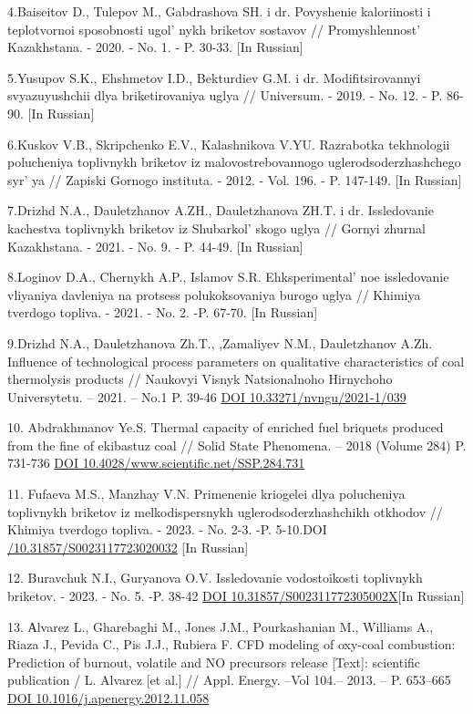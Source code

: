 4.Baiseitov D., Tulepov M., Gabdrashova SH. i dr. Povyshenie
kaloriinosti i teplotvornoi sposobnosti ugol' nykh
briketov sostavov // Promyshlennost'{} Kazakhstana. -
2020. - No. 1. - P. 30-33. {[}In Russian{]}

5.Yusupov S.K., Ehshmetov I.D., Bekturdiev G.M. i dr. Modifitsirovannyi
svyazuyushchii dlya briketirovaniya uglya // Universum. - 2019. - No.
12. - P. 86-90. {[}In Russian{]}

6.Kuskov V.B., Skripchenko E.V., Kalashnikova V.YU. Razrabotka
tekhnologii polucheniya toplivnykh briketov iz malovostrebovannogo
uglerodsoderzhashchego syr' ya // Zapiski Gornogo
instituta. - 2012. - Vol. 196. - P. 147-149. {[}In Russian{]}

7.Drizhd N.A., Dauletzhanov A.ZH., Dauletzhanova ZH.T. i dr.
Issledovanie kachestva toplivnykh briketov iz
Shubarkol' skogo uglya // Gornyi zhurnal Kazakhstana. -
2021. - No. 9. - P. 44-49. {[}In Russian{]}

8.Loginov D.A., Chernykh A.P., Islamov S.R.
Ehksperimental' noe issledovanie vliyaniya davleniya na
protsess polukoksovaniya burogo uglya // Khimiya tverdogo topliva. -
2021. - No. 2. -P. 67-70. {[}In Russian{]}

9.Drizhd N.A., Dauletzhanova Zh.T., ,Zamaliyev N.M., Dauletzhanov A.Zh.
Influence of technological process parameters on qualitative
characteristics of coal thermolysis products // Naukovyi Visnyk
Natsionalnoho Hirnychoho Universytetu. -- 2021. -- No.1 P. 39-46
\href{https://doi.org/10.33271/nvngu/2021-1/039}{DOI
10.33271/nvngu/2021-1/039}

10. Abdrakhmanov Ye.S. Thermal capacity of enriched fuel briquets
produced from the fine of ekibastuz coal // Solid State Phenomena. --
2018 (Volume 284) P. 731-736
\href{https://doi.org/10.4028/www.scientific.net/SSP.284.731}{DOI
10.4028/www.scientific.net/SSP.284.731}

11. Fufaeva M.S., Manzhay V.N. Primenenie kriogelei dlya polucheniya
toplivnykh briketov iz melkodispersnykh uglerodsoderzhashchikh otkhodov
// Khimiya tverdogo topliva. - 2023. - No. 2-3. -P. 5-10.DOI
\href{https://doi.org/10.31857/S0023117723020032}{/10.31857/S0023117723020032}
{[}In Russian{]}

12. Buravchuk N.I., Guryanova O.V. Issledovanie vodostoikosti toplivnykh
briketov. - 2023. - No. 5. -P. 38-42
\href{https://doi.org/10.31857/S002311772305002X}{DOI
10.31857/S002311772305002X}{[}In Russian{]}

13. Аlvarez L., Gharebaghi M., Jones J.M., Pourkashanian M., Williams
A., Riaza J., Pevida C., Pis J.J., Rubiera F. CFD modeling of oxy-coal
combustion: Prediction of burnout, volatile and NO precursors release
{[}Text{]}: scientific publication / L. Alvarez {[}et al.{]} // Appl.
Energy. --Vol 104.-- 2013. -- P. 653--665
\href{https://doi.org/10.1016/j.apenergy.2012.11.058}{DOI
10.1016/j.apenergy.2012.11.058}

